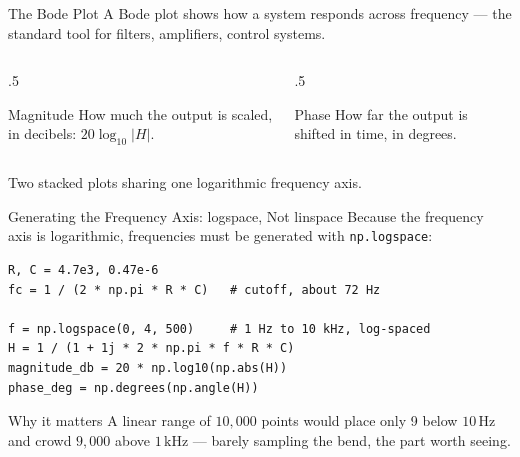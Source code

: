 \documentclass[9pt,aspectratio=169,xcolor=table]{beamer}
\begin{document}
\begin{frame}{The Bode Plot}
    \leavevmode
    A \alert{Bode plot} shows how a system responds across frequency ---
    the standard tool for filters, amplifiers, control systems.

    \vspace{2mm}
    \begin{columns}[t]
        \begin{column}{.5\textwidth}
            \begin{block}{Magnitude}
                \small How much the output is scaled, in
                \alert{decibels}: $20\log_{10}|H|$.
            \end{block}
        \end{column}
        \begin{column}{.5\textwidth}
            \begin{block}{Phase}
                \small How far the output is shifted in time, in
                degrees.
            \end{block}
        \end{column}
    \end{columns}

    \vspace{3mm}
    {\small Two stacked plots sharing one \alert{logarithmic frequency
    axis}.}
\end{frame}

\begin{frame}[fragile]{Generating the Frequency Axis: logspace, Not linspace}
    \leavevmode
    Because the frequency axis is logarithmic, frequencies must be
    generated with \texttt{np.logspace}:

\begin{lstlisting}
R, C = 4.7e3, 0.47e-6
fc = 1 / (2 * np.pi * R * C)   # cutoff, about 72 Hz

f = np.logspace(0, 4, 500)     # 1 Hz to 10 kHz, log-spaced
H = 1 / (1 + 1j * 2 * np.pi * f * R * C)
magnitude_db = 20 * np.log10(np.abs(H))
phase_deg = np.degrees(np.angle(H))
\end{lstlisting}

    \vspace{1mm}
    \begin{alertblock}{Why it matters}
        A \alert{linear} range of $10{,}000$ points would place only 9
        below $10\,\text{Hz}$ and crowd $9{,}000$ above $1\,\text{kHz}$
        --- barely sampling the bend, the part worth seeing.
    \end{alertblock}
\end{frame}
\end{document}
